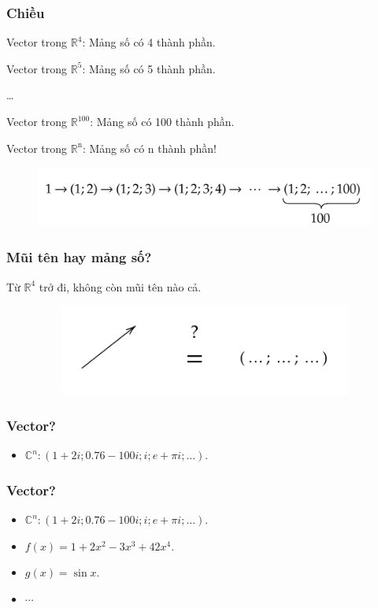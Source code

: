 \begin{frame}
    \frametitle{Chiều}
    Vector trong   \(\mathbb{R}^4\): Mảng số có 4 thành phần.
 
    Vector trong \(\mathbb{R}^5\): Mảng số có 5 thành phần.

    \dots

    Vector trong \(\mathbb{R}^{100}\): Mảng số có 100 thành phần.
    
    Vector trong \(\mathbb{R}^{\text{n}}\): Mảng số có n thành phần!
    \begin{figure}
        \centering
        \includegraphics[width=12cm, height=2cm]{Slides/Figure/1to100.png}
    \end{figure}
\end{frame}
\begin{frame}
    \frametitle{Mũi tên hay mảng số?}
    Từ \(\mathbb{R}^4\) trở đi, không còn mũi tên nào cả.
    \begin{figure}
        \centering
        \includegraphics[width=12cm, height=3cm]{Slides/Figure/arroworarray.png}
    \end{figure}
\end{frame}
\begin{frame}
    \frametitle{Vector?}
    \begin{itemize}
        \item \(\mathbb{C}^n : (1+2i; 0.76-100i; i; e+\pi i;\dots)\).
    \end{itemize}
\end{frame}
\begin{frame}
    \frametitle{Vector?}
    \begin{itemize}
        \item \(\mathbb{C}^n : (1+2i; 0.76-100i; i; e+\pi i;\dots)\).
        \item \(f(x)=1+2x^2 -3x^3 +42x^4\).
        \item \(g(x)=\sin x\).
        \item \(\cdots\)
    \end{itemize}
\end{frame}
